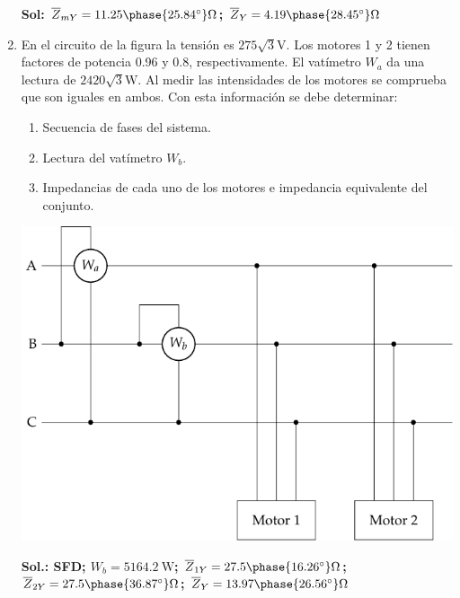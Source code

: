 \begin{enumerate}
\textbf{Sol:
  $\overline{Z}_{mY} = 11.25\phase{\ang{25.84}}\unit{\ohm}$;
  $\overline{Z}_{Y} = 4.19\phase{\ang{28.45}}\unit{\ohm}$
}

\item En el circuito de la figura la tensión es $275\sqrt{3}\unit{\volt}$. Los motores 1 y 2 tienen factores de potencia 0.96 y 0.8, respectivamente. El vatímetro $W_a$ da una lectura de $2420\sqrt{3}\unit{\watt}$. Al medir las intensidades de los motores se comprueba que son iguales en ambos. Con esta información se debe determinar:

\begin{enumerate}
\item Secuencia de fases del sistema.
\item Lectura del vatímetro $W_b$.
\item Impedancias de cada uno de los motores e impedancia equivalente del conjunto.
\end{enumerate}

\begin{center}
  \includegraphics[height=0.23\textheight]{../figs/BT3_13}
\end{center}

\textbf{Sol.:
  SFD;
  $W_b = \qty{5164.2}{\watt}$;
  $\overline{Z}_{1Y} = 27.5\phase{\ang{16.26}}\unit{\ohm}$;
  $\overline{Z}_{2Y} = 27.5\phase{\ang{36.87}}\unit{\ohm}$;
  $\overline{Z}_{Y} = 13.97\phase{\ang{26.56}}\unit{\ohm}$
  }

\end{enumerate}

